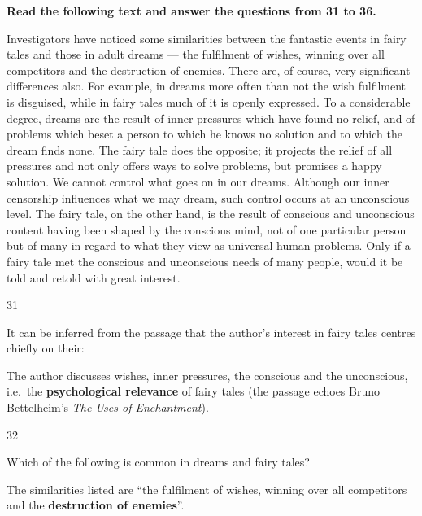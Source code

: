 \begin{context}
\textbf{Read the following text and answer the questions from 31 to 36.}\par\smallskip
Investigators have noticed some similarities between the fantastic events in fairy tales and those in adult dreams --- the fulfilment of wishes, winning over all competitors and the destruction of enemies. There are, of course, very significant differences also. For example, in dreams more often than not the wish fulfilment is disguised, while in fairy tales much of it is openly expressed. To a considerable degree, dreams are the result of inner pressures which have found no relief, and of problems which beset a person to which he knows no solution and to which the dream finds none. The fairy tale does the opposite; it projects the relief of all pressures and not only offers ways to solve problems, but promises a happy solution. We cannot control what goes on in our dreams. Although our inner censorship influences what we may dream, such control occurs at an unconscious level. The fairy tale, on the other hand, is the result of conscious and unconscious content having been shaped by the conscious mind, not of one particular person but of many in regard to what they view as universal human problems. Only if a fairy tale met the conscious and unconscious needs of many people, would it be told and retold with great interest.
\end{context}
\begin{question}{31}
{It can be inferred from the passage that the author's interest in fairy tales centres chiefly on their:\par}
\begin{explain}
The author discusses wishes, inner pressures, the conscious and the unconscious, i.e.\ the \textbf{psychological relevance} of fairy tales (the passage echoes Bruno Bettelheim's \emph{The Uses of Enchantment}).
\end{explain}
\end{question}

\begin{question}{32}
{Which of the following is common in dreams and fairy tales?\par}
\begin{explain}
The similarities listed are ``the fulfilment of wishes, winning over all competitors and the \textbf{destruction of enemies}''.
\end{explain}
\end{question}

